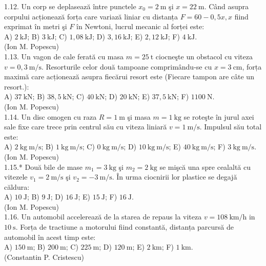 \documentclass[10pt]{article}
\begin{document}
1.12. Un corp se deplasează între punctele $x_{0}=2 \mathrm{~m}$ şi $x=22 \mathrm{~m}$. Când asupra corpului acționează forța care variază liniar cu distanța $F=60-0,5 x, x$ fiind exprimat în metri şi $F$ în Newtoni, lucrul mecanic al forței este:\\ A) $2 \mathrm{~kJ}$; B) $3 \mathrm{~kJ}$; C) $1,08 \mathrm{~kJ}$; D) $3,16 \mathrm{~kJ}$; E) $2,12 \mathrm{~kJ}$; F) $4 \mathrm{~kJ}$.\\ (Ion M. Popescu)\\

1.13. Un vagon de cale ferată cu masa $m=25 \mathrm{~t}$ ciocneşte un obstacol cu viteza $v=0,3 \mathrm{~m} / \mathrm{s}$. Resorturile celor două tampoane comprimându-se cu $x=3 \mathrm{~cm}$, forța maximă care acționează asupra fiecărui resort este (Fiecare tampon are câte un resort.):\\ A) $37 \mathrm{~kN}$; B) $38,5 \mathrm{~kN}$; C) $40 \mathrm{~kN}$; D) $20 \mathrm{~kN}$; E) $37,5 \mathrm{~kN}$; F) $1100 \mathrm{~N}$.\\ (Ion M. Popescu)\\

1.14. Un disc omogen cu raza $R=1 \mathrm{~m}$ şi masa $m=1 \mathrm{~kg}$ se roteşte în jurul axei sale fixe care trece prin centrul său cu viteza liniară $v=1 \mathrm{~m} / \mathrm{s}$. Impulsul său total este:\\ A) $2 \mathrm{~kg} \mathrm{~m} / \mathrm{s}$; B) $1 \mathrm{~kg} \mathrm{~m} / \mathrm{s}$; C) $0 \mathrm{~kg} \mathrm{~m} / \mathrm{s}$; D) $10 \mathrm{~kg} \mathrm{~m} / \mathrm{s}$; E) $40 \mathrm{~kg} \mathrm{~m} / \mathrm{s}$; F) $3 \mathrm{~kg} \mathrm{~m} / \mathrm{s}$.\\ (Ion M. Popescu)\\

1.15.* Două bile de mase $m_{1}=3 \mathrm{~kg}$ şi $m_{2}=2 \mathrm{~kg}$ se mişcă una spre cealaltă cu vitezele $v_{1}=2 \mathrm{~m} / \mathrm{s}$ şi $v_{2}=-3 \mathrm{~m} / \mathrm{s}$. În urma ciocnirii lor plastice se degajă căldura:\\ A) $10 \mathrm{~J}$; B) $9 \mathrm{~J}$; D) $16 \mathrm{~J}$; E) $15 \mathrm{~J}$; F) $16 \mathrm{~J}$.\\ (Ion M. Popescu)\\

1.16. Un automobil accelerează de la starea de repaus la viteza $v=108 \mathrm{~km} / \mathrm{h}$ in $10 \mathrm{~s}$. Forța de tractiune a motorului fiind constantă, distanța parcursă de automobil în acest timp este:\\ A) $150 \mathrm{~m}$; B) $200 \mathrm{~m}$; C) $225 \mathrm{~m}$; D) $120 \mathrm{~m}$; E) $2 \mathrm{~km}$; F) $1 \mathrm{~km}$.\\ (Constantin P. Cristescu)\\
\end{document}
